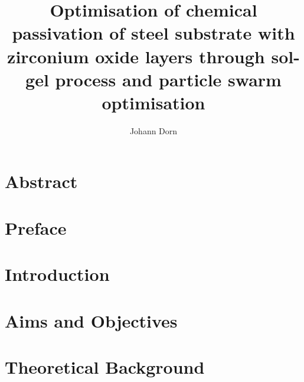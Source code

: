 \documentclass[a4paper]{article}
\title{Optimisation of chemical passivation of steel substrate with zirconium oxide layers through sol-gel process and particle swarm optimisation}
\author{Johann Dorn}
\begin{document}
\maketitle


\clearpage
\section*{Abstract}


\section*{Preface}
%

\tableofcontents
\clearpage
\printglossaries
\clearpage

\section{Introduction}                                


\section{Aims and Objectives}


\section{Theoretical Background}
%



\end{document}
